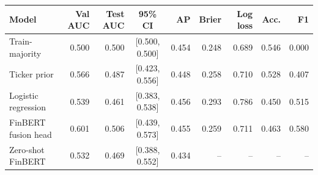 \begin{tabular}{lrrcrrrrr}
\toprule
Model & Val AUC & Test AUC & 95\% CI & AP & Brier & Log loss & Acc. & F1 \\
\midrule
Train-majority & 0.500 & 0.500 & [0.500, 0.500] & 0.454 & 0.248 & 0.689 & 0.546 & 0.000 \\
Ticker prior & 0.566 & 0.487 & [0.423, 0.556] & 0.448 & 0.258 & 0.710 & 0.528 & 0.407 \\
Logistic regression & 0.539 & 0.461 & [0.383, 0.538] & 0.456 & 0.293 & 0.786 & 0.450 & 0.515 \\
FinBERT fusion head & 0.601 & 0.506 & [0.439, 0.573] & 0.455 & 0.259 & 0.711 & 0.463 & 0.580 \\
Zero-shot FinBERT & 0.532 & 0.469 & [0.388, 0.552] & 0.434 & -- & -- & -- & -- \\
\bottomrule
\end{tabular}
